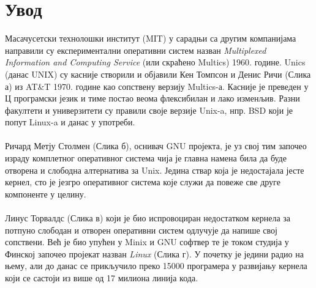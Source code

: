 \documentclass[a4paper,14pt]{article}
\begin{document}
\section*{Увод}
Масачусетски технолошки институт (MIT) у сарадњи са другим компанијама направили су експериментални оперативни систем назван \textit{Multiplexed Information and Computing Service} (или скраћено Multics) 1960. године. Unics (данас UNIX) су касније створили и објавили Кен Томпсон и Денис Ричи (Слика а) из AT\&T 1970. године као сопствену верзију Multics-а. Касније је преведен у Ц програмски језик и тиме постао веома флексибилан и лако изменљив. Разни факултети и универзитети су правили своје верзије Unix-a, нпр. BSD који је попут Linux-a и данас у употреби.\cite{revos}
\\\\
Ричард Метју Столмен (Слика б), оснивач GNU пројекта\cite{gnu}, је уз свој тим започео израду комплетног оперативног система чија је главна намена била да буде отворена и слободна алтернатива за Unix. Једина ствар која је недостајала јесте кернел, сто је језгро оперативног система које служи да повеже све друге компоненте у целину.
\\\\
Линус Торвалдс (Слика в) који је био испровоциран недостатком кернела за потпуно слободан и отворен оперативни систем одлучује да напише свој сопствени. Већ је био упућен у Minix и GNU софтвер те је током студија у Финској започео пројекат назван \textit{Linux} (Слика г). У почетку је једини радио на њему, али до данас се прикључило преко 15000 програмера у развијању кернела који се састоји из више од 17 милиона линија кода\cite{linuxfoundation}.
\\\\
\end{document}
